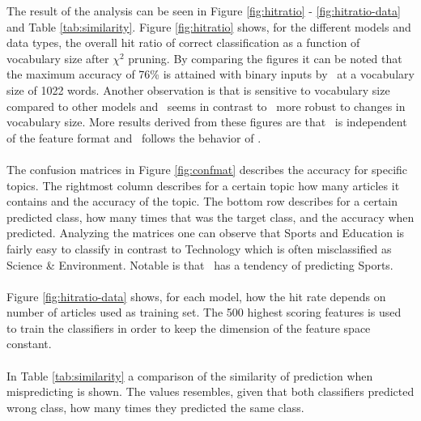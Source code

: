 \label{sec:result}
The result of the analysis can be seen in Figure \ref{fig:hitratio} - \ref{fig:hitratio-data} and Table \ref{tab:similarity}. Figure \ref{fig:hitratio} shows, for the different models and data types, the overall hit ratio of correct classification as a function of vocabulary size after $\chi^2$ pruning. By comparing the figures it can be noted that the maximum accuracy of 76\% is attained with binary inputs by \mn\ at a vocabulary size of 1022 words. Another observation is that \bn is sensitive to vocabulary size compared to other models and \svm\  seems in contrast to \bn\ more robust to changes in vocabulary size. More results derived from these figures are that \rf\ is independent of the feature format and \hy\ follows the behavior of \mn.
\\\\
The confusion matrices in Figure \ref{fig:confmat} describes the accuracy for specific topics. The rightmost column describes for a certain topic how many articles it contains and the accuracy of the topic. The bottom row describes for a certain predicted class, how many times that was the target class, and the accuracy when predicted. Analyzing the matrices one can observe that Sports and Education is fairly easy to classify in contrast to Technology which is often misclassified as Science \& Environment. Notable is that \rf\ has a tendency of predicting Sports.
\\\\
Figure \ref{fig:hitratio-data} shows, for each model, how the hit rate depends on number of articles used as training set. The 500 highest scoring features is used to train the classifiers in order to keep the dimension of the feature space constant.
\\\\
In Table \ref{tab:similarity} a comparison of the similarity of prediction when mispredicting is shown. The values resembles, given that both classifiers predicted wrong class, how many times they predicted the same class.

\onecolumn

\onecolumn

\onecolumn

\twocolumn
